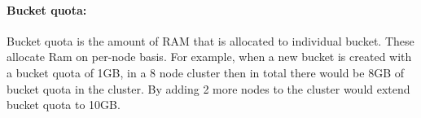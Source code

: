          \paragraph{Bucket quota:}
           Bucket quota is the amount of RAM that is allocated to individual bucket. These allocate Ram on per-node basis. For example, when a new bucket is created with a bucket quota of 1GB, in a 8 node cluster then in total there would be 8GB of bucket quota in the cluster. By adding 2 more nodes to the cluster would extend bucket quota to 10GB.
 
 
 
 
 
 
 
 
 
 
 
 
 
 
 
 
 
 
 
 
 
 
 

	